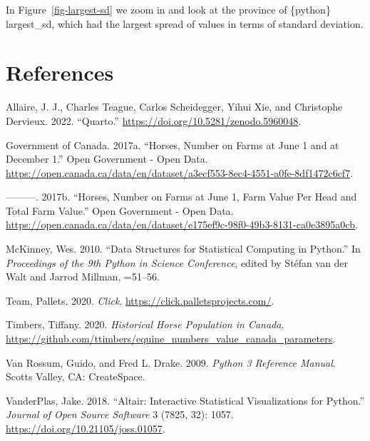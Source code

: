 \documentclass[
  letterpaper,
  DIV=11,
  numbers=noendperiod]{scrartcl}
\newlength{\cslhangindent}
\newenvironment{CSLReferences}[2] %
 {\begin{list}{}{%
  \setlength{\itemindent}{0pt}
  \setlength{\leftmargin}{0pt}
  \setlength{\parsep}{0pt}
  \ifodd #1
   \setlength{\leftmargin}{\cslhangindent}
   \setlength{\itemindent}{-1\cslhangindent}
  \fi
  \setlength{\itemsep}{#2\baselineskip}}}
 {\end{list}}
\begin{document}
In Figure~\ref{fig-largest-sd} we zoom in and look at the province of
\{python\} largest\_sd, which had the largest spread of values in terms
of standard deviation.

\section*{References}\label{references}

\label{refs}
\begin{CSLReferences}{1}{0}
Allaire, J. J., Charles Teague, Carlos Scheidegger, Yihui Xie, and
Christophe Dervieux. 2022. {``{Quarto}.''}
\url{https://doi.org/10.5281/zenodo.5960048}.

Government of Canada. 2017a. {``Horses, Number on Farms at June 1 and at
December 1.''} Open Government - Open Data.
\url{https://open.canada.ca/data/en/dataset/a3ecf553-8ec4-4551-a0fe-8df1472c6cf7}.

---------. 2017b. {``Horses, Number on Farms at June 1, Farm Value Per
Head and Total Farm Value.''} Open Government - Open Data.
\url{https://open.canada.ca/data/en/dataset/e175ef9c-98f0-49b3-8131-ca0e3895a0cb}.

McKinney, Wes. 2010. {``Data Structures for Statistical Computing in
Python.''} In \emph{Proceedings of the 9th Python in Science
Conference}, edited by Stéfan van der Walt and Jarrod Millman, =51--56.

Team, Pallets. 2020. \emph{Click}.
\url{https://click.palletsprojects.com/}.

Timbers, Tiffany. 2020. \emph{Historical Horse Population in Canada}.
\url{https://github.com/ttimbers/equine_numbers_value_canada_parameters}.

Van Rossum, Guido, and Fred L. Drake. 2009. \emph{Python 3 Reference
Manual}. Scotts Valley, CA: CreateSpace.

VanderPlas, Jake. 2018. {``Altair: Interactive Statistical
Visualizations for Python.''} \emph{Journal of Open Source Software} 3
(7825, 32): 1057. \url{https://doi.org/10.21105/joss.01057}.

\end{CSLReferences}
\end{document}
